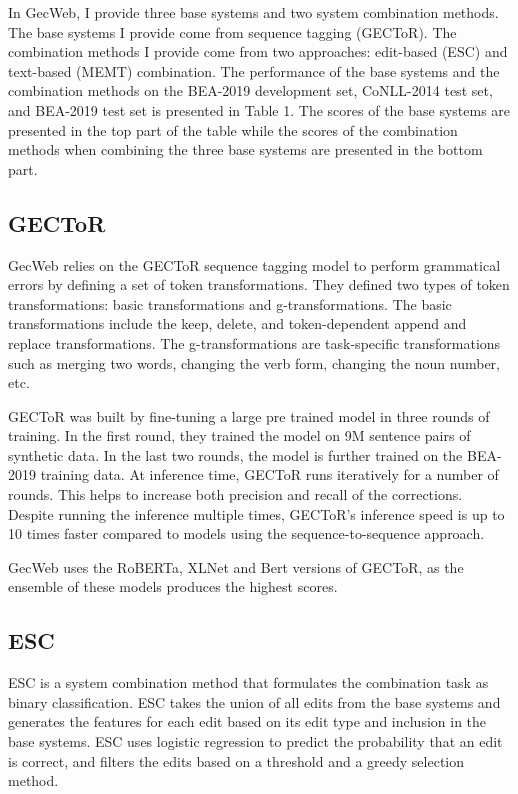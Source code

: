 In GecWeb, I provide three base systems and two system combination methods.
The base systems I provide come from sequence tagging (GECToR).
The combination methods I provide come from two approaches: edit-based (ESC) and text-based (MEMT) combination.
The performance of the base systems and the combination methods on the BEA-2019 development set, CoNLL-2014 test set, and BEA-2019 test set is presented in Table 1.
The scores of the base systems are presented in the top part of the table while the scores of the combination methods when combining the three base systems are presented in the bottom part.

\subsection{GECToR}
\label{gector}

GecWeb relies on the GECToR sequence tagging model to perform grammatical errors by defining a set of token transformations.
They defined two types of token transformations: basic transformations and g-transformations.
The basic transformations include the keep, delete, and token-dependent append and replace transformations.
The g-transformations are task-specific transformations such as merging two words, changing the verb form, changing the noun number, etc.

GECToR was built by fine-tuning a large pre trained model in three rounds of training.
In the first round, they trained the model on 9M sentence pairs of synthetic data.
In the last two rounds, the model is further trained on the BEA-2019 training data.
At inference time, GECToR runs iteratively for a number of rounds.
This helps to increase both precision and recall of the corrections.
Despite running the inference multiple times, GECToR's inference speed is up to 10 times faster compared to models using the sequence-to-sequence approach.

GecWeb uses the RoBERTa, XLNet and Bert versions of GECToR, as the ensemble of these models produces the highest scores.

\subsection{ESC}
\label{esc}

ESC is a system combination method that formulates the combination task as binary classification.
ESC takes the union of all edits from the base systems and generates the features for each edit based on its edit type and inclusion in the base systems.
ESC uses logistic regression to predict the probability that an edit is correct, and filters the edits based
on a threshold and a greedy selection method.

